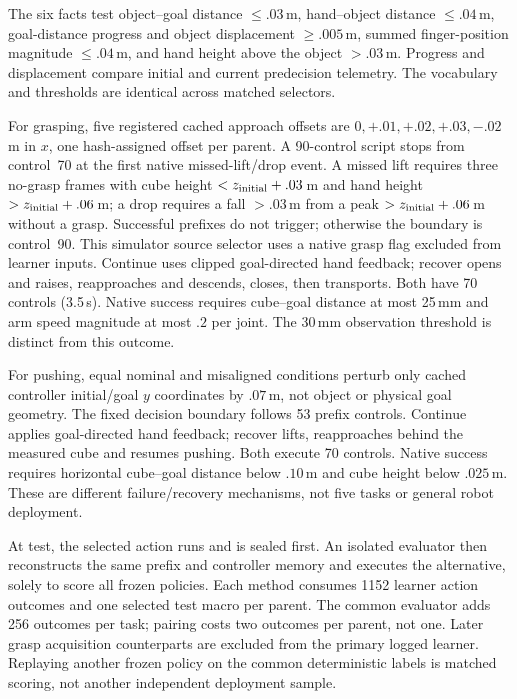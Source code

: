 \documentclass[conference]{IEEEtran}
\begin{document}
The six facts test object--goal distance $\leq.03$\,m, hand--object distance $\leq.04$\,m, goal-distance progress and object displacement $\geq.005$\,m, summed finger-position magnitude $\leq.04$\,m, and hand height above the object $>.03$\,m. Progress and displacement compare initial and current predecision telemetry. The vocabulary and thresholds are identical across matched selectors.

For grasping, five registered cached approach offsets are $0,+.01,+.02,+.03,-.02$\,m in $x$, one hash-assigned offset per parent. A 90-control script stops from control~70 at the first native missed-lift/drop event. A missed lift requires three no-grasp frames with cube height $<z_{\rm initial}+.03$\,m and hand height $>z_{\rm initial}+.06$\,m; a drop requires a fall $>.03$\,m from a peak $>z_{\rm initial}+.06$\,m without a grasp. Successful prefixes do not trigger; otherwise the boundary is control~90. This simulator source selector uses a native grasp flag excluded from learner inputs. Continue uses clipped goal-directed hand feedback; recover opens and raises, reapproaches and descends, closes, then transports. Both have 70 controls (3.5\,s). Native success requires cube--goal distance at most 25\,mm and arm speed magnitude at most $.2$ per joint. The 30\,mm observation threshold is distinct from this outcome.

For pushing, equal nominal and misaligned conditions perturb only cached controller initial/goal $y$ coordinates by $.07$\,m, not object or physical goal geometry. The fixed decision boundary follows 53 prefix controls. Continue applies goal-directed hand feedback; recover lifts, reapproaches behind the measured cube and resumes pushing. Both execute 70 controls. Native success requires horizontal cube--goal distance below $.10$\,m and cube height below $.025$\,m. These are different failure/recovery mechanisms, not five tasks or general robot deployment.

At test, the selected action runs and is sealed first. An isolated evaluator then reconstructs the same prefix and controller memory and executes the alternative, solely to score all frozen policies. Each method consumes 1152 learner action outcomes and one selected test macro per parent. The common evaluator adds 256 outcomes per task; pairing costs two outcomes per parent, not one. Later grasp acquisition counterparts are excluded from the primary logged learner. Replaying another frozen policy on the common deterministic labels is matched scoring, not another independent deployment sample.
\end{document}
